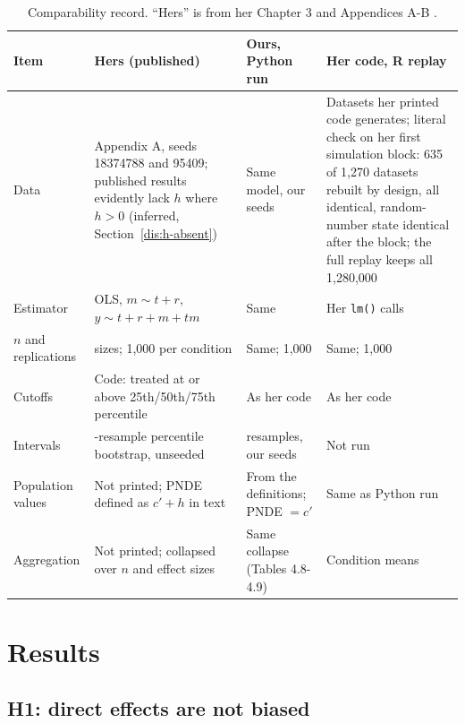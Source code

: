 \begin{table}[ht]
\centering\footnotesize
\caption{Comparability record. ``Hers'' is from her Chapter 3 and Appendices A-B \citep{chen2021}.}\label{tab:comparability}
\begin{tabular}{@{}>{\raggedright\arraybackslash}p{}>{\raggedright\arraybackslash}p{}>{\raggedright\arraybackslash}p{}>{\raggedright\arraybackslash}p{}@{}}
\toprule
Item & Hers (published) & Ours, Python run & Her code, R replay\\
\midrule
Data & Appendix A, seeds 18374788 and 95409; published results evidently lack $h$ where $h > 0$ (inferred, Section~\ref{dis:h-absent}) & Same model, our seeds & Datasets her printed code generates; literal check on her first simulation block: 635 of 1,270 datasets rebuilt by design, all identical, random-number state identical after the block; the full replay keeps all 1,280,000\\
Estimator & OLS, $m \sim t + r$, $y \sim t + r + m + tm$ & Same & Her \texttt{lm()} calls\\
$n$ and replications & 5 sizes; 1,000 per condition & Same; 1,000 & Same; 1,000\\
Cutoffs & Code: treated at or above 25th/50th/75th percentile & As her code & As her code\\
Intervals & 500-resample percentile bootstrap, unseeded & 500 resamples, our seeds & Not run\\
Population values & Not printed; PNDE defined as $c' + h$ in text & From the definitions; PNDE $= c'$ & Same as Python run\\
Aggregation & Not printed; collapsed over $n$ and effect sizes & Same collapse (Tables 4.8-4.9) & Condition means\\
\bottomrule
\end{tabular}
\end{table}

\section{Results}\label{sec:results}

\subsection{H1: direct effects are not biased}\label{sec:h1}


